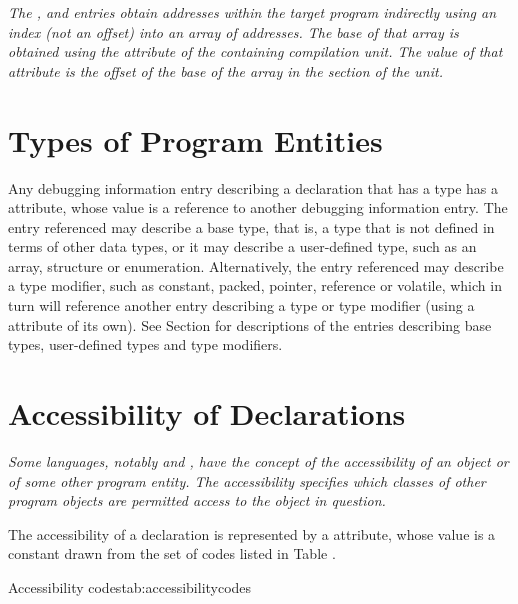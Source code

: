 \textit{The \DWLLEbaseaddressselectionentry, \DWLLEstartendentry{}
and \DWLLEstartlengthentry entries obtain addresses within the 
target program indirectly using an index (not an offset) into an 
array of addresses. The base of that array is obtained using the 
\DWATaddrbase{} attribute of the containing compilation unit. 
The value of that attribute is the offset of the base of the array 
in the \dotdebugaddr{} section of the unit.}

\section{Types of Program Entities}
\label{chap:typesofprogramentities}
\hypertarget{chap:DWATtypetypeofdeclaration}{}
Any debugging information entry describing a declaration that
has a type has 
a \DWATtype{} attribute, whose value is a
reference to another debugging information entry. The entry
referenced may describe a base type, that is, a type that is
not defined in terms of other data types, or it may describe a
user-defined type, such as an array, structure or enumeration.
Alternatively, the entry referenced may describe a type
modifier, such as constant, packed, pointer, reference or
volatile, which in turn will reference another entry describing
a type or type modifier (using 
a \DWATtype{} attribute of its
own). See 
Section   
for descriptions of the entries describing
base types, user-defined types and type modifiers.


\section{Accessibility of Declarations}
\label{chap:accessibilityofdeclarations}
\textit{Some languages, notably  and 
, have the concept of
the accessibility of an object or of some other program
entity. The accessibility specifies which classes of other
program objects are permitted access to the object in question.}

The accessibility of a declaration is 
\hypertarget{chap:DWATaccessibilitycandadadeclarations}{}
represented by a 
\DWATaccessibility{} 
attribute, whose
value is a constant drawn from the set of codes listed in Table 
.

\begin{simplenametable}[1.9in]{Accessibility codes}{tab:accessibilitycodes}
\DWACCESSpublicTARG{}          \\
\DWACCESSprivateTARG{}        \\
\DWACCESSprotectedTARG{}    \\
\end{simplenametable}

